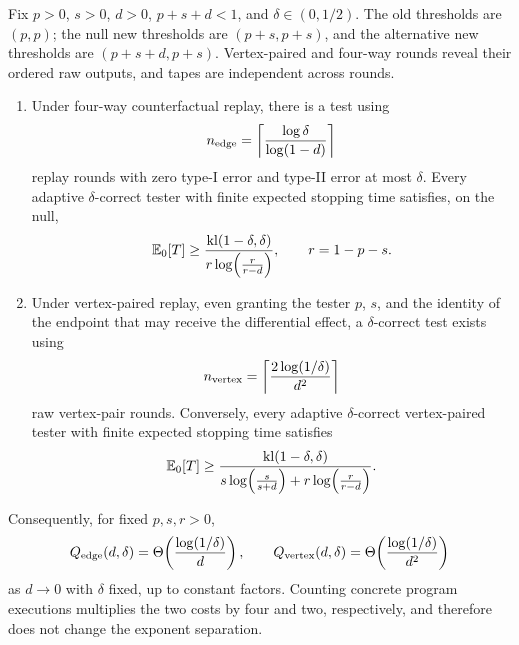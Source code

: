 \begin{theorem}
\label{thm:counterfactual-replay}
Fix \(p>0\), \(s>0\), \(d>0\), \(p+s+d<1\), and
\(\delta\in(0,1/2)\).  The old thresholds are \((p,p)\); the null new
thresholds are \((p+s,p+s)\), and the alternative new thresholds are
\((p+s+d,p+s)\).  Vertex-paired and four-way rounds reveal their ordered raw
outputs, and tapes are independent across rounds.

\begin{enumerate}[label=(\roman*)]
\item Under four-way counterfactual replay, there is a test using
\begin{equation}\label{eq:formal-results-019}
n_{\rm edge}
=
\left\lceil
\frac{\log\delta}{\log(1-d)}
\right\rceil
\end{equation}
replay rounds with zero type-I error and type-II error at most \(\delta\).
Every adaptive \(\delta\)-correct tester with finite expected stopping time
satisfies, on the null,
\begin{equation}\label{eq:formal-results-020}
\mathbb{E}_0[T]
\ge
\frac{\mathrm{kl}(1-\delta,\delta)}
{r\log\!\left(\frac{r}{r-d}\right)},
\qquad
r=1-p-s.
\end{equation}

\item Under vertex-paired replay, even granting the tester \(p\), \(s\), and the
identity of the endpoint that may receive the differential effect, a
\(\delta\)-correct test exists using
\begin{equation}\label{eq:formal-results-021}
n_{\rm vertex}
=
\left\lceil
\frac{2\log(1/\delta)}{d^2}
\right\rceil
\end{equation}
raw vertex-pair rounds.  Conversely, every adaptive \(\delta\)-correct
vertex-paired tester with finite expected stopping time satisfies
\begin{equation}\label{eq:formal-results-022}
\mathbb{E}_0[T]
\ge
\frac{\mathrm{kl}(1-\delta,\delta)}
{
s\log\!\left(\frac{s}{s+d}\right)
+
r\log\!\left(\frac{r}{r-d}\right)
}.
\end{equation}
\end{enumerate}

Consequently, for fixed \(p,s,r>0\),
\begin{equation}\label{eq:formal-results-023}
Q_{\rm edge}(d,\delta)
=
\Theta\!\left(
\frac{\log(1/\delta)}{d}
\right),
\qquad
Q_{\rm vertex}(d,\delta)
=
\Theta\!\left(
\frac{\log(1/\delta)}{d^2}
\right)
\end{equation}
as \(d\to0\) with \(\delta\) fixed, up to constant factors.  Counting concrete program executions
multiplies the two costs by four and two, respectively, and therefore does not
change the exponent separation.
\end{theorem}

